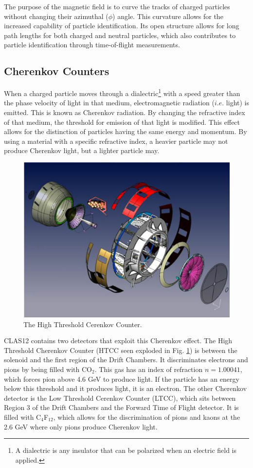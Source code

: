 The purpose of the magnetic field is to curve the tracks of charged particles without changing their azimuthal ($\phi$) angle. This curvature allows for the increased capability of particle identification. Its open structure allows for long path lengths for both charged and neutral particles, which also contributes to particle identification through time-of-flight measurements.

\subsection{Cherenkov Counters}
When a charged particle moves through a dialectric\footnote{A dialectric is any insulator that can be polarized when an electric field is applied.} with a speed greater than the phase velocity of light in that medium, electromagnetic radiation ($i.e.$ light) is emitted. This is known as Cherenkov radiation. By changing the refractive index of that medium, the threshold for emission of that light is modified. This effect allows for the distinction of particles having the same energy and momentum. By using a material with a specific refractive index, a heavier particle may not produce Cherenkov light, but a lighter particle may.

\begin{figure}
	\centering
	\includegraphics[width=0.9\linewidth]{figures/htcc.png}
	\caption{\label{fig:htcc}The High Threshold Cerenkov Counter.}
\end{figure}
CLAS12 contains two detectors that exploit this Cherenkov effect. The High Threshold Cherenkov Counter (HTCC seen exploded in Fig. \ref{fig:htcc}) is between the solenoid and the first region of the Drift Chambers. It discriminates electrons and pions by being filled with CO$_2$. This gas has an index of refraction $n=1.00041$, which forces pion above 4.6 GeV to produce light. If the particle has an energy below this threshold and it produces light, it is an electron. The other Cherenkov detector is the Low Threshold Cerenkov Counter (LTCC), which sits between Region 3 of the Drift Chambers and the Forward Time of Flight detector. It is filled with C$_4$F$_12$, which allows for the discrimination of pions and kaons at the 2.6 GeV where only pions produce Cherenkov light.

